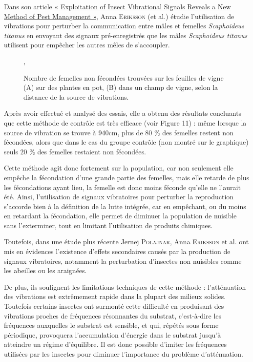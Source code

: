 Dans son article
\href{http://journals.plos.org/plosone/article?id=10.1371/journal.pone.0032954}{«
Exploitation of Insect Vibrational Signals Reveals a New Method of Pest
Management »}, Anna \textsc{Eriksson} (et al.) étudie l'utilisation de
vibrations pour perturber la communication entre mâles et femelles
\emph{Scaphoideus titanus} en envoyant des signaux pré-enregistrés que
les mâles \emph{Scaphoideus titanus} utilisent pour empêcher les autres
mêles de s'accoupler.

\begin{figure}[htb!]
	\centering
	\def\svgwidth{\columnwidth}
	
	\caption{Nombre de femelles non fécondées trouvées sur les feuilles de vigne (A) sur des plantes en pot, (B) dans un champ de vigne, selon la distance de la source de vibrations.},
\end{figure}

Après avoir effectué et analysé des essais, elle a obtenu des résultats
concluants que cette méthode de contrôle est très efficace (voir Figure
11) : même lorsque la source de vibration se trouve à 940cm, plus de 80
\% des femelles restent non fécondées, alors que dans le cas du groupe
contrôle (non montré sur le graphique) seuls 20 \% des femelles
restaient non fécondées.

Cette méthode agit donc fortement sur la population, car non seulement
elle empêche la fécondation d'une grande partie des femelles, mais elle
retarde de plus les fécondations ayant lieu, la femelle est donc moins
féconde qu'elle ne l'aurait été. Ainsi, l'utilisation de signaux
vibratoires pour perturber la reproduction s'accorde bien à la
définition de la lutte intégrée, car en empêchant, ou du moins en
retardant la fécondation, elle permet de diminuer la population de
nuisible sans l'exterminer, tout en limitant l'utilisation de produits
chimiques.

Toutefois, dans
\href{http://onlinelibrary.wiley.com/enhanced/doi/10.1002/ps.3848}{une
étude plus récente} Jernej \textsc{Polajnar}, Anna \textsc{Eriksson} et
al. ont mis en évidences l'existence d'effets secondaires causés par la
production de signaux vibratoires, notamment la perturbation d'insectes
non nuisibles comme les abeilles ou les araignées.

De plus, ils soulignent les limitations techniques de cette méthode :
l'atténuation des vibrations est extrêmement rapide dans la plupart des
milieux solides. Toutefois certains insectes ont surmonté cette
difficulté en produisant des vibrations proches de fréquences
résonnantes du substrat, c'est-à-dire les fréquences auxquelles le
substrat est sensible, et qui, répétés sous forme périodique, provoquera
l'accumulation d'énergie dans le substrat jusqu'à atteindre un régime
d'équilibre. Il est donc possible d'imiter les fréquences utilisées par
les insectes pour diminuer l'importance du problème d'atténuation.

